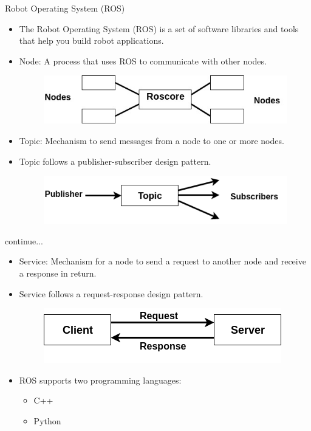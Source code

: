 \begin{frame}{Robot Operating System (ROS)}
    \begin{itemize}
    \item The Robot Operating System (ROS) is a set of software libraries and tools that help you build robot applications. 
    \item Node: A process that uses ROS to communicate with other nodes.
    \begin{figure}
    \includegraphics[scale=0.40]{roscore.jpg}
    \end{figure}
    \item Topic: Mechanism to send messages from a node to one or more nodes.
    \item Topic follows a publisher-subscriber design pattern.
    \begin{figure}
    \includegraphics[scale=0.40]{topic.png}
    \end{figure}
    \end{itemize}
\end{frame}

\begin{frame}{continue...}
\begin{itemize}
\item Service: Mechanism for a node to send a request to another node  and receive a response in return.
\item Service follows a request-response design pattern.
\begin{figure}
    \includegraphics[scale=0.4]{service.png}
    \end{figure}
\item ROS supports two programming languages:
	\begin{itemize}
	\item C++
	\item Python
	\end{itemize}
\end{itemize}
\end{frame}